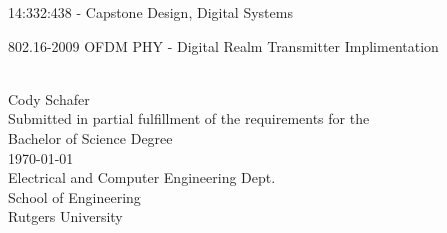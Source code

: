 
\begin{titlepage}
\begin{center}

\vspace*{\fill}

	{14:332:438 - Capstone Design, Digital Systems}	\\
	\begin{huge}{802.16-2009 OFDM PHY - Digital Realm Transmitter Implimentation}\end{huge} \\
	{Cody Schafer}  \\
	{\small
		Submitted in partial fulfillment of the requirements for the \\
		Bachelor of Science Degree
	} \\
	{\today} \\
	{\small
		Electrical and Computer Engineering Dept. \\
		School of Engineering \\
		Rutgers University
	}

\vspace*{\fill}
%

\end{center}
\end{titlepage}
